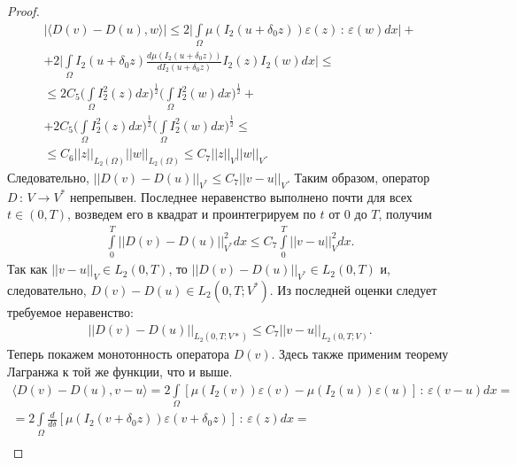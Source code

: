 \documentclass[14pt, a4paper]{extarticle}
\numberwithin{equation}{section}
\begin{document}
\begin{proof}
\begin{equation*}
\begin{gathered}
                |\langle D(v) - D(u), w \rangle| \leq 2 \bigg| \int\limits_\Omega \mu(I_2(u+\delta_0 z))\varepsilon(z)\, : \,\varepsilon(w) dx \bigg| +\\
                + 2 \bigg| \int\limits_\Omega I_2(u+\delta_0 z) \frac{d\mu(I_2(u+\delta_0 z))}{dI_2(u+\delta_0 z)} I_2(z) I_2(w) dx \bigg| \leq\\
                \leq 2C_5 \bigg( \int\limits_\Omega I^2_2(z)dx \bigg)^\frac{1}{2} \bigg( \int\limits_\Omega I^2_2(w)dx \bigg)^\frac{1}{2} +\\
                + 2C_5 \bigg( \int\limits_\Omega I^2_2(z)dx \bigg)^\frac{1}{2} \bigg( \int\limits_\Omega I^2_2(w)dx \bigg)^\frac{1}{2} \leq\\
                \leq C_6 ||z||_{L_2(\Omega)}||w||_{L_2(\Omega)} \leq C_7 ||z||_V ||w||_V.
            \end{gathered}
        \end{equation*}
        Следовательно, $||D(v) - D(u)||_{V^*} \leq C_7 ||v-u||_V$. Таким образом, оператор $D\, : \,V \rightarrow V^*$ непрепывен.
        Последнее неравенство выполнено почти для всех $t \in (0,T)$, возведем его в квадрат и проинтегрируем по $t$ от $0$ до $T$, получим
        \begin{equation*}
            \begin{gathered}
                \int\limits_0^T||D(v) - D(u)||^2_{V^*}dx \leq C_7 \int\limits_0^T||v-u||^2_V dx.
            \end{gathered}
        \end{equation*}
        Так как $||v - u||_V \in L_2(0,T)$, то $||D(v) - D(u)||_{V^*} \in L_2(0,T)$ и, следовательно, $D(v) - D(u) \in L_2(0,T;V^*)$.
        Из последней оценки следует требуемое неравенство:
        \begin{equation*}
            \begin{gathered}
                ||D(v) - D(u)||_{L_2(0,T;V*)} \leq C_7||v-u||_{L_2(0,T;V)}.
            \end{gathered}
        \end{equation*}
        Теперь покажем монотонность оператора $D(v)$. Здесь также применим теорему Лагранжа к той же функции, что и выше.
        \begin{equation*}
            \begin{gathered}
                \langle D(v) - D(u), v-u \rangle = 2\int\limits_\Omega [\mu(I_2(v))\varepsilon(v) - \mu(I_2(u))\varepsilon(u)]\, : \,\varepsilon(v-u)dx =\\
                = 2\int\limits_\Omega \frac{d}{d\delta} [\mu(I_2(v+\delta_0 z))\varepsilon(v+\delta_0 z)]\, : \,\varepsilon(z)dx =\\

\end{gathered}
\end{equation*}
\end{proof}
\end{document}
